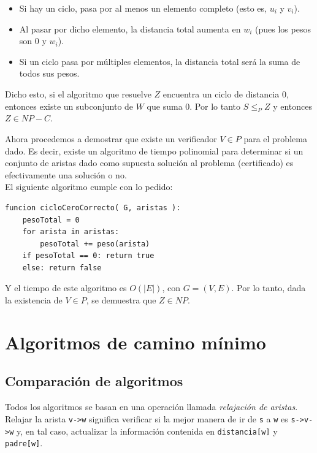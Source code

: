 \documentclass{article}
\def\code#1{\texttt{#1}}
\newcommand\tab[1][0.5cm]{\hspace*{#1}}
\begin{document}
\begin{enumerate}
\begin{itemize}
                    \item Si hay un ciclo, pasa por al menos un elemento completo (esto es, $u_{i}$ y $v_{i}$).
                    \item Al pasar por dicho elemento, la distancia total aumenta en $w_{i}$ (pues los pesos son $0$
                    y $w_{i}$).
                    \item Si un ciclo pasa por múltiples elementos, la distancia total será la suma de todos sus pesos.
                \end{itemize}
            \tab\tab Dicho esto, si el algoritmo que resuelve $Z$ encuentra un ciclo de distancia $0$, entonces existe
            un subconjunto de $W$ que suma $0$. Por lo tanto $S \leq_{P} Z$ y entonces $Z \in NP-C$.

            \tab Ahora procedemos a demostrar que existe un verificador $V \in P$ para el problema dado. Es decir,
            existe un algoritmo de tiempo polinomial para determinar si un conjunto de aristas dado como supuesta
            solución al problema (certificado) es efectivamente una solución o no. \\
            \tab El siguiente algoritmo cumple con lo pedido:

            \begin{lstlisting}
funcion cicloCeroCorrecto( G, aristas ):
    pesoTotal = 0
    for arista in aristas:
        pesoTotal += peso(arista)
    if pesoTotal == 0: return true
    else: return false
            \end{lstlisting}

            \tab Y el tiempo de este algoritmo es $O(|E|)$, con $G = (V, E)$. Por lo tanto, dada la existencia
            de $V \in P$, se demuestra que $Z \in NP$.
    \end{enumerate}

    \newpage

    \section{Algoritmos de camino mínimo}
        \subsection{Comparación de algoritmos}
            \tab Todos los algoritmos se basan en una operación llamada \emph{relajación de aristas}. Relajar
        la arista \code{v->w} significa verificar si la mejor manera de ir de \code{s} a \code{w} es \code{s->v->w}
        y, en tal caso, actualizar la información contenida en \code{distancia[w]} y \code{padre[w]}.
\end{document}
